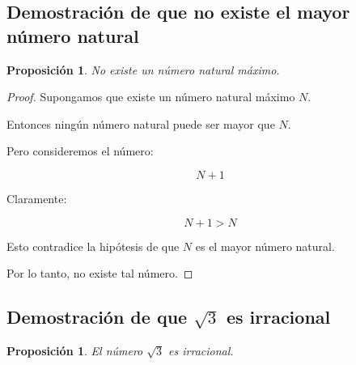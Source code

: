 \documentclass[12pt,final]{report}
\theoremstyle{plain}
\newtheorem{proposition}[theorem]{Proposición}
\theoremstyle{definition}
\begin{document}
\newpage

\subsection{Demostración de que no existe el mayor número natural}

\begin{proposition}
No existe un número natural máximo.
\end{proposition}

\begin{proof}

Supongamos que existe un número natural máximo $N$.

Entonces ningún número natural puede ser mayor que $N$.

Pero consideremos el número:

\[
N+1
\]

Claramente:

\[
N+1 > N
\]

Esto contradice la hipótesis de que $N$ es el mayor número natural.

Por lo tanto, no existe tal número.

\end{proof}

\newpage


\subsection{Demostración de que $\sqrt{3}$ es irracional}

\begin{proposition}
El número $\sqrt{3}$ es irracional.
\end{proposition}
\end{document}
